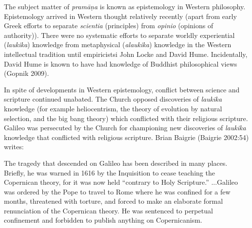 The subject matter of {\sl pramāṇa} is known as epistemology in Western philosophy.  Epistemology arrived in Western thought relatively recently (apart from early Greek efforts to separate {\sl scientia} (principles) from {\sl opinio} (opinions of authority)). There were no systematic efforts to separate worldly experiential ({\sl laukika}) knowledge from metaphysical ({\sl alaukika}) knowledge in the Western intellectual tradition until empiricistsi John Locke and David Hume.  Incidentally, David Hume is known to have had knowledge of Buddhist philosophical views (Gopnik 2009).

In spite of developments in Western epistemology, conflict between science and scripture continued unabated. The Church opposed discoveries of {\sl laukika} knowledge (for example heliocentrism, the theory of evolution by natural selection, and the big bang theory) which conflicted with their religious scripture.  Galileo was persecuted by the Church for championing new discoveries of {\sl laukika} knowledge that conflicted with religious scripture.  Brian Baigrie (Baigrie 2002:54) writes:

\newpage

\begin{myquote}
The tragedy that descended on Galileo has been described in many places. Briefly, he was warned in 1616 by the Inquisition to cease teaching the Copernican theory, for it was now held ``contrary to Holy Scripture.'' ...Galileo was ordered by the Pope to travel to Rome where he was confined for a few months, threatened with torture, and forced to make an elaborate formal renunciation of the Copernican theory.  He was sentenced to perpetual confinement and forbidden to publish anything on Copernicanism.
\end{myquote}


